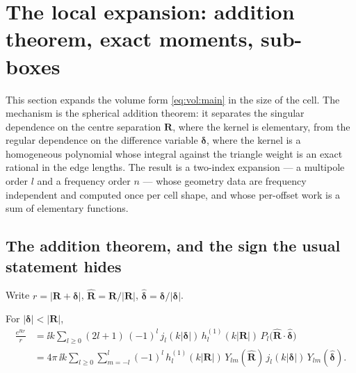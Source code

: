 \section{The local expansion: addition theorem, exact moments, sub-boxes}
\label{sec:exp}

This section expands the volume form \eqref{eq:vol:main} in the size of the cell. The
mechanism is the spherical addition theorem: it separates the singular dependence on the
centre separation $\mathbf{R}$, where the kernel is elementary, from the regular
dependence on the difference variable $\boldsymbol{\delta}$, where the kernel is a
homogeneous polynomial whose integral against the triangle weight is an exact rational in
the edge lengths. The result is a two-index expansion --- a multipole order $l$ and a
frequency order $n$ --- whose geometry data are frequency independent and computed once
per cell shape, and whose per-offset work is a sum of elementary functions.

\subsection{The addition theorem, and the sign the usual statement hides}
\label{sec:exp:add}

Write $r = |\mathbf{R}+\boldsymbol{\delta}|$, $\hat{\mathbf{R}} = \mathbf{R}/|\mathbf{R}|$,
$\hat{\boldsymbol{\delta}} = \boldsymbol{\delta}/|\boldsymbol{\delta}|$.

\begin{proposition}
\label{prop:exp:add}
For $|\boldsymbol{\delta}| < |\mathbf{R}|$,
\begin{align}
\frac{e^{\ii k r}}{r}
&= \ii k \sum_{l\ge 0} (2l+1)\,(-1)^l\,
   j_l(k|\boldsymbol{\delta}|)\,h^{(1)}_l(k|\mathbf{R}|)\,
   P_l\bigl(\hat{\mathbf{R}}\cdot\hat{\boldsymbol{\delta}}\bigr)
\label{eq:exp:addP}\\
&= 4\pi\,\ii k \sum_{l\ge 0}\sum_{m=-l}^{l} (-1)^l\,
   h^{(1)}_l(k|\mathbf{R}|)\,Y_{lm}(\hat{\mathbf{R}})\,
   j_l(k|\boldsymbol{\delta}|)\,Y_{lm}(\hat{\boldsymbol{\delta}}) .
\label{eq:exp:addY}
\end{align}
\end{proposition}

